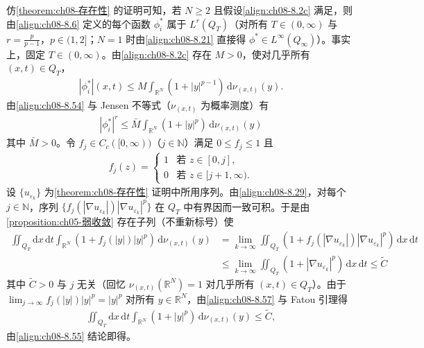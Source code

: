 \documentclass[../../main.tex]{subfiles}%
\begin{document}
\begin{remark}\label{remark:ch08-phi星可积}
仿\cref{theorem:ch08-存在性} 的证明可知，若 $N\geqslant2$ 且假设\eqref{align:ch08-8.2c} 满足，则由\eqref{align:ch08-8.6} 定义的每个函数 $\phi_i^*$ 属于 $L^r(Q_T)$（对所有 $T\in(0,\infty)$ 与 $r=\frac{p}{p-1}$，$p\in(1,2]$；$N=1$ 时由\eqref{align:ch08-8.21} 直接得 $\phi^*\in L^\infty(Q_\infty)$）。事实上，固定 $T\in(0,\infty)$。由\eqref{align:ch08-8.2c} 存在 $M>0$，使对几乎所有 $(x,t)\in Q_T$，
\begin{align}
|\phi_i^*|(x,t)\leqslant M\int_{\mathbb{R}^N}(1+|y|^{p-1})\,\mathrm{d}\nu_{(x,t)}(y). \label{align:ch08-8.54}
\end{align}
由\eqref{align:ch08-8.54} 与 Jensen 不等式（$\nu_{(x,t)}$ 为概率测度）有
\begin{align}
|\phi_i^*|^r\leqslant\bar M\int_{\mathbb{R}^N}(1+|y|^p)\,\mathrm{d}\nu_{(x,t)}(y) \label{align:ch08-8.55}
\end{align}
其中 $\bar M>0$。令 $f_j\in C_c([0,\infty))$（$j\in\mathbb{N}$）满足 $0\leqslant f_j\leqslant1$ 且
\begin{align}
f_j(z)=
\begin{cases}
1 & \text{若 }z\in[0,j],\\
0 & \text{若 }z\in[j+1,\infty).
\end{cases} 
\label{align:ch08-8.56}
\end{align}
设 $\{u_{\varepsilon_k}\}$ 为\cref{theorem:ch08-存在性} 证明中所用序列。由\eqref{align:ch08-8.29}，对每个 $j\in\mathbb{N}$，序列 $\{f_j(|\nabla u_{\varepsilon_k}|)|\nabla u_{\varepsilon_k}|^p\}$ 在 $Q_T$ 中有界因而一致可积。于是由\cref{proposition:ch05-弱收敛} 存在子列（不重新标号）使
\begin{align}
\iint_{Q_T}\mathrm{d}x\,\mathrm{d}t\int_{\mathbb{R}^N}(1+f_j(|y|)|y|^p)\,\mathrm{d}\nu_{(x,t)}(y)
&=\lim_{k\to\infty}\iint_{Q_T}(1+f_j(|\nabla u_{\varepsilon_k}|)|\nabla u_{\varepsilon_k}|^p)\,\mathrm{d}x\,\mathrm{d}t\nonumber\\
&\leqslant\lim_{k\to\infty}\iint_{Q_T}(1+|\nabla u_{\varepsilon_k}|^p)\,\mathrm{d}x\,\mathrm{d}t\leqslant\widetilde C \label{align:ch08-8.57}
\end{align}
其中 $\widetilde C>0$ 与 $j$ 无关（回忆 $\nu_{(x,t)}(\mathbb{R}^N)=1$ 对几乎所有 $(x,t)\in Q_T$）。由于 $\lim_{j\to\infty}f_j(|y|)|y|^p=|y|^p$ 对所有 $y\in\mathbb{R}^N$，由\eqref{align:ch08-8.57} 与 Fatou 引理得
\begin{align*}
\iint_{Q_T}\mathrm{d}x\,\mathrm{d}t\int_{\mathbb{R}^N}(1+|y|^p)\,\mathrm{d}\nu_{(x,t)}(y)\leqslant\widetilde C,
\end{align*}
由\eqref{align:ch08-8.55} 结论即得。
\end{remark}
\end{document}
